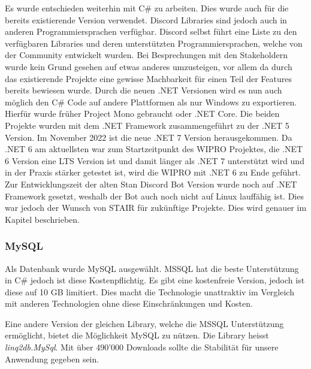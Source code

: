\documentclass[a4paper, table]{article}
\begin{document}
Es wurde entschieden weiterhin mit C\# zu arbeiten.
Dies wurde auch für die bereits existierende Version verwendet.
Discord Libraries sind jedoch auch in anderen Programmiersprachen verfügbar.
Discord selbst führt eine Liste zu den verfügbaren Libraries und deren unterstützten Programmiersprachen, welche von der Community entwickelt wurden.\autocite{noauthor_discord_2022-1}
Bei Besprechungen mit den Stakeholdern wurde kein Grund gesehen auf etwas anderes umzusteigen, vor allem da durch das existierende Projekte eine gewisse Machbarkeit für einen Teil der Features bereits bewiesen wurde.
Durch die neuen .NET Versionen wird es nun auch möglich den C\# Code auf andere Plattformen als nur Windows zu exportieren.
Hierfür wurde früher Project Mono gebraucht oder .NET Core.
Die beiden Projekte wurden mit dem .NET Framework zusammengeführt zu der .NET 5 Version.\autocite{schwichtenberg_net_2019}
Im November 2022 ist die neue .NET 7 Version herausgekommen.
Da .NET 6 am aktuellsten war zum Startzeitpunkt des WIPRO Projektes, die .NET 6 Version eine LTS Version ist und damit länger als .NET 7 unterstützt wird und in der Praxis stärker getestet ist, wird die WIPRO mit .NET 6 zu Ende geführt.\autocite{noauthor_net_2022}
Zur Entwicklungszeit der alten Stan Discord Bot Version wurde noch auf .NET Framework gesetzt, weshalb der Bot auch noch nicht auf Linux lauffähig ist.
Dies war jedoch der Wunsch von STAIR für zukünftige Projekte.
Dies wird genauer im Kapitel  beschrieben.

\subsubsection{MySQL}

Als Datenbank wurde MySQL ausgewählt.
MSSQL hat die beste Unterstützung in C\# jedoch ist diese Kostenpflichtig.
Es gibt eine kostenfreie Version, jedoch ist diese auf 10 GB limitiert.
Dies macht die Technologie unattraktiv im Vergleich mit anderen Technologien ohne diese Einschränkungen und Kosten.\autocite{noauthor_sql_nodate}

Eine andere Version der gleichen Library, welche die MSSQL Unterstützung ermöglicht, bietet die Möglichkeit MySQL zu nützen.
Die Library heisst \textit{linq2db.MySql}.
Mit über 490'000 Downloads sollte die Stabilität für unsere Anwendung gegeben sein.\autocite{noauthor_linq2dbmysql_nodate}
\end{document}
